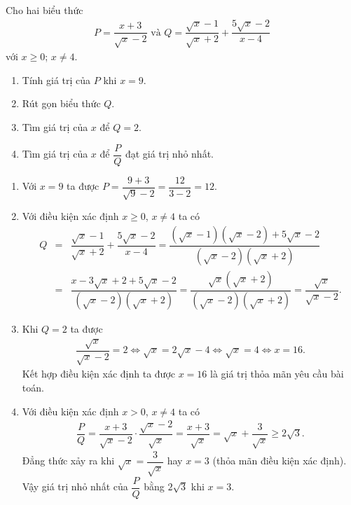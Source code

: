 \begin{bt}%
	Cho hai biểu thức
	\begin{eqnarray*}
		P = \dfrac{x+3}{\sqrt{x}-2} \text{ và } Q = \dfrac{\sqrt{x}-1}{\sqrt{x}+2} + \dfrac{5\sqrt{x}-2}{x-4}
	\end{eqnarray*}
	với $x \geq 0$; $x \neq 4$.
	\begin{enumerate}
		\item Tính giá trị của $P$ khi $x=9$.
		\item Rút gọn biểu thức $Q$.
		\item Tìm giá trị của $x$ để $Q=2$.
		\item Tìm giá trị của $x$ để $\dfrac{P}{Q}$ đạt giá trị nhỏ nhất.
	\end{enumerate}
	\loigiai
	{
		\begin{enumerate}
			\item Với $x=9$ ta được $P = \dfrac{9+3}{\sqrt{9}-2} = \dfrac{12}{3-2} = 12$.
			\item Với điều kiện xác định $x\geq 0$, $x\neq 4$ ta có
			\allowdisplaybreaks
			\begin{eqnarray*}
				Q &=& \dfrac{\sqrt{x}-1}{\sqrt{x}+2} + \dfrac{5\sqrt{x}-2}{x-4} = \dfrac{\left(\sqrt{x}-1\right)\left(\sqrt{x}-2\right) + 5\sqrt{x}-2}{\left(\sqrt{x}-2\right)\left(\sqrt{x}+2\right)}\\
				&=& \dfrac{x-3\sqrt{x}+2+5\sqrt{x}-2}{\left(\sqrt{x}-2\right)\left(\sqrt{x}+2\right)} = \dfrac{\sqrt{x}\left(\sqrt{x}+2\right)}{\left(\sqrt{x}-2\right)\left(\sqrt{x}+2\right)} = \dfrac{\sqrt{x}}{\sqrt{x}-2}.
			\end{eqnarray*}
			\item Khi $Q=2$ ta được
			\allowdisplaybreaks
			\begin{eqnarray*}
				\dfrac{\sqrt{x}}{\sqrt{x}-2} = 2 \Leftrightarrow \sqrt{x}=2\sqrt{x}-4 \Leftrightarrow \sqrt{x}=4 \Leftrightarrow x=16.
			\end{eqnarray*}
			Kết hợp điều kiện xác định ta được $x=16$ là giá trị thỏa mãn yêu cầu bài toán.
			\item Với điều kiện xác định $x > 0$, $x\neq 4$ ta có
			\allowdisplaybreaks
			\begin{eqnarray*}
				\dfrac{P}{Q} = \dfrac{x+3}{\sqrt{x}-2} \cdot \dfrac{\sqrt{x}-2}{\sqrt{x}} = \dfrac{x+3}{\sqrt{x}} = \sqrt{x}+\dfrac{3}{\sqrt{x}} \geq 2\sqrt{3}.
			\end{eqnarray*}
			Đẳng thức xảy ra khi $\sqrt{x}=\dfrac{3}{\sqrt{x}}$ hay $x=3$ (thỏa mãn điều kiện xác định).\\
			Vậy giá trị nhỏ nhất của $\dfrac{P}{Q}$ bằng $2\sqrt{3}$ khi $x=3$.
		\end{enumerate}
	}
\end{bt}

